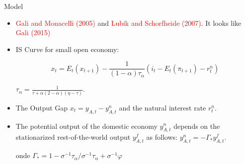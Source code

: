 \documentclass[9pt]{beamer}
\let\olditem\item
\renewcommand{\item}{%
\olditem\vspace{\fill}}
\begin{document}
\begin{frame}{Model}
\begin{itemize}

\item \textcolor{red}{Gali and Monacelli (2005)} and \textcolor{red}{Lubik and Schorfheide (2007)}. It looks like \textcolor{red}{Gali (2015)}

\item IS Curve for small open economy:

\begin{equation*}
    x_t = E_t(x_{t+1}) - \frac{1}{(1-\alpha)\tau_{\alpha}}\left(i_t - E_t(\pi_{t+1}) - r_t^{n} \right)
\end{equation*}

$\tau_{\alpha} = \frac{1}{\tau + \alpha(2 - \alpha)(\eta - \tau)}$.

\item The Output Gap $x_t = y_{A,t} - y_{A,t}^{n}$ and the natural interest rate $r_t^{n}$.

\item The potential output of the domestic economy $y_{A,t}^{n}$ depends on the stationarized rest-of-the-world output  $y_{A,t}^{f}$ as follows: $y_{A,t}^{n} = - \Gamma_{*}y_{A,t}^{f} $.

onde $\Gamma_{*}=1-\sigma^{-1} \tau_{\alpha} / \sigma^{-1} \tau_{\alpha}+\sigma^{-1} \varphi$


\end{itemize}
\end{frame}
\end{document}
